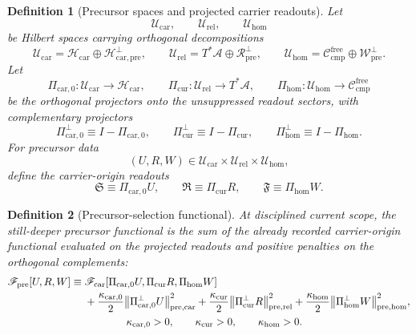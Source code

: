 \documentclass[11pt]{article}
\newcommand{\Sub}{\mathcal A}
\newcommand{\CompFree}{\mathscr C_{\mathrm{cmp}}^{\mathrm{free}}}
\newcommand{\CarrierFunctional}{\mathscr F_{\mathrm{car}}}
\newcommand{\PreFunctional}{\mathscr F_{\mathrm{pre}}}
\newcommand{\CarrierClass}{\mathscr H_{\mathrm{car}}}
\newcommand{\CarrierSeed}{\mathfrak S}
\newcommand{\RelabelSeed}{\mathfrak R}
\newcommand{\FreeSeed}{\mathfrak F}
\newcommand{\PreTensorClass}{\mathscr U_{\mathrm{car}}}
\newcommand{\PreRelabelClass}{\mathscr U_{\mathrm{rel}}}
\newcommand{\PreFreeClass}{\mathscr U_{\mathrm{hom}}}
\newcommand{\PreTensor}{U}
\newcommand{\PreRelabel}{R}
\newcommand{\PreFree}{W}
\newcommand{\PreCarProj}{\Pi_{\mathrm{car},0}}
\newcommand{\PreCarPerp}{\Pi_{\mathrm{car},0}^{\perp}}
\newcommand{\CurrentProj}{\Pi_{\mathrm{cur}}}
\newcommand{\CurrentPerp}{\Pi_{\mathrm{cur}}^{\perp}}
\newcommand{\FreeReadProj}{\Pi_{\mathrm{hom}}}
\newcommand{\FreeReadPerp}{\Pi_{\mathrm{hom}}^{\perp}}
\newcommand{\PreCarGap}{\kappa_{\mathrm{car},0}}
\newcommand{\CurrentGap}{\kappa_{\mathrm{cur}}}
\newcommand{\HomGap}{\kappa_{\mathrm{hom}}}
\newtheorem{definition}{Definition}
\begin{document}
\begin{definition}[Precursor spaces and projected carrier readouts]
\label{def:precursor}
Let
\[
\PreTensorClass,\qquad
\PreRelabelClass,\qquad
\PreFreeClass
\]
be Hilbert spaces carrying orthogonal decompositions
\begin{equation}
\PreTensorClass=\CarrierClass\oplus \mathscr H_{\mathrm{car,pre}}^\perp,
\qquad
\PreRelabelClass=T^*\Sub\oplus \mathscr R_{\mathrm{pre}}^\perp,
\qquad
\PreFreeClass=\CompFree\oplus \mathscr W_{\mathrm{pre}}^\perp.
\label{eq:prespaces}
\end{equation}
Let
\[
\PreCarProj:\PreTensorClass\to\CarrierClass,
\qquad
\CurrentProj:\PreRelabelClass\to T^*\Sub,
\qquad
\FreeReadProj:\PreFreeClass\to\CompFree
\]
be the orthogonal projectors onto the unsuppressed readout sectors, with complementary projectors
\[
\PreCarPerp\equiv I-\PreCarProj,
\qquad
\CurrentPerp\equiv I-\CurrentProj,
\qquad
\FreeReadPerp\equiv I-\FreeReadProj.
\]
For precursor data
\[
(\PreTensor,\PreRelabel,\PreFree)
\in
\PreTensorClass\times\PreRelabelClass\times\PreFreeClass,
\]
define the carrier-origin readouts
\begin{equation}
\CarrierSeed\equiv \PreCarProj\PreTensor,
\qquad
\RelabelSeed\equiv \CurrentProj\PreRelabel,
\qquad
\FreeSeed\equiv \FreeReadProj\PreFree.
\label{eq:pre_readout}
\end{equation}
\end{definition}

\begin{definition}[Precursor-selection functional]
\label{def:prefunctional}
At disciplined current scope, the still-deeper precursor functional is the sum of the already recorded carrier-origin functional evaluated on the projected readouts and positive penalties on the orthogonal complements:
\begin{equation}
\begin{aligned}
\PreFunctional[\PreTensor,\PreRelabel,\PreFree]
\equiv\;
&\CarrierFunctional[\PreCarProj\PreTensor,\CurrentProj\PreRelabel,\FreeReadProj\PreFree]
\\
&+\frac{\PreCarGap}{2}\norm{\PreCarPerp\PreTensor}_{\mathrm{pre,car}}^2
+\frac{\CurrentGap}{2}\norm{\CurrentPerp\PreRelabel}_{\mathrm{pre,rel}}^2
+\frac{\HomGap}{2}\norm{\FreeReadPerp\PreFree}_{\mathrm{pre,hom}}^2,
\\
&\qquad\qquad
\PreCarGap>0,\qquad
\CurrentGap>0,\qquad
\HomGap>0.
\end{aligned}
\label{eq:Fpre}
\end{equation}
\end{definition}
\end{document}
